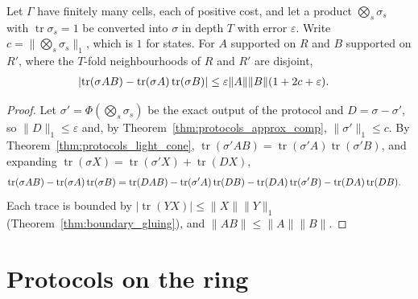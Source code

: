 \begin{theorem}
    \label{thm:protocols_approx_light_cone}
    \leanok
    Let $\Gamma$ have finitely many cells, each of positive cost, and let a product
    $\bigotimes_s\sigma_s$ with $\operatorname{tr}\sigma_s=1$ be converted into $\sigma$ in
    depth $T$ with error $\varepsilon$. Write $c=\lVert\bigotimes_s\sigma_s\rVert_1$, which is
    $1$ for states. For $A$ supported on $R$ and $B$ supported on $R'$, where the $T$-fold
    neighbourhoods of $R$ and $R'$ are disjoint,
    \begin{align}
        \lvert\operatorname{tr}(\sigma AB)
        -\operatorname{tr}(\sigma A)\operatorname{tr}(\sigma B)\rvert
        &\le\varepsilon\lVert A\rVert\lVert B\rVert(1+2c+\varepsilon).
        \notag
    \end{align}
\end{theorem}
\begin{proof}\leanok
    Let $\sigma'=\Phi(\bigotimes_s\sigma_s)$ be the exact output of the protocol and
    $D=\sigma-\sigma'$, so $\lVert D\rVert_1\le\varepsilon$ and, by
    Theorem~\ref{thm:protocols_approx_comp}, $\lVert\sigma'\rVert_1\le c$. By
    Theorem~\ref{thm:protocols_light_cone},
    $\operatorname{tr}(\sigma'AB)=\operatorname{tr}(\sigma'A)\operatorname{tr}(\sigma'B)$, and
    expanding $\operatorname{tr}(\sigma X)=\operatorname{tr}(\sigma'X)+\operatorname{tr}(DX)$,
    \begin{align}
        \operatorname{tr}(\sigma AB)-\operatorname{tr}(\sigma A)\operatorname{tr}(\sigma B)
        &=\operatorname{tr}(DAB)-\operatorname{tr}(\sigma'A)\operatorname{tr}(DB)
        -\operatorname{tr}(DA)\operatorname{tr}(\sigma'B)
        -\operatorname{tr}(DA)\operatorname{tr}(DB).
        \notag
    \end{align}
    Each trace is bounded by $\lvert\operatorname{tr}(YX)\rvert\le\lVert X\rVert\lVert Y\rVert_1$
    (Theorem~\ref{thm:boundary_gluing}), and $\lVert AB\rVert\le\lVert A\rVert\lVert B\rVert$.
\end{proof}

\section{Protocols on the ring}
\label{sec:protocols_ring}

